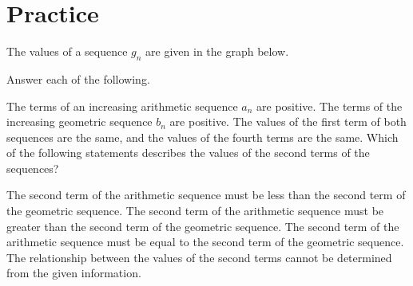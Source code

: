 \documentclass[addpoints]{exam}
\begin{document}
\section*{Practice}
\begin{questions}
    \question The values of a sequence $g_n$ are given in the graph below.
    \begin{center}
    \end{center}
    Answer each of the following.

    \question The terms of an increasing arithmetic sequence $a_n$ are positive. The terms of the increasing geometric sequence $b_n$ are positive. The values of the first term of both sequences are the same, and the values of the fourth terms are the same. Which of the following statements describes the values of the second terms of the sequences?
    \begin{choices}
        \choice The second term of the arithmetic sequence must be less than the second term of the geometric sequence.
        \choice The second term of the arithmetic sequence must be greater than the second term of the geometric sequence.
        \choice The second term of the arithmetic sequence must be equal to the second term of the geometric sequence.
        \choice The relationship between the values of the second terms cannot be determined from the given information.
    \end{choices}


\end{questions}
\end{document}
